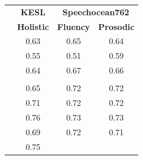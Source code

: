 \documentclass[a4paper]{article}
\begin{document}
\begin{table} [ht]
\centering
    \setcounter{table}{0}
	\begin{tabular}{c|c|c|c}
	\Xhline{4\arrayrulewidth}

	\multicolumn{1}{l}{{\textbf{Method}}}&
	\multicolumn{1}{|c}{\textbf{KESL}}&
	\multicolumn{2}{|c}{\textbf{Speechocean762}} \\ \cline{2-4}
    
    
	\multicolumn{1}{p{2.5cm}}{}&
	\multicolumn{1}{|p{1.0cm}}{\centering\textbf{Holistic}}& 
	\multicolumn{1}{|p{1.0cm}}{\centering\textbf{Fluency}}&
	\multicolumn{1}{|p{1.0cm}}{\centering\textbf{Prosodic}}\\

    \Xhline{3\arrayrulewidth}
	\multicolumn{1}{l}{\text{GOP}}&
	\multicolumn{1}{|c}{0.63}&
	\multicolumn{1}{|c}{0.65}&
	\multicolumn{1}{|c}{0.64}\\

	\multicolumn{1}{l}{\text{Agg + Seq}}&
	\multicolumn{1}{|c}{0.55}&
	\multicolumn{1}{|c}{0.51}&
	\multicolumn{1}{|c}{0.59}\\
	
	\multicolumn{1}{l}{\text{Agg + Seq + GOP}} &
	\multicolumn{1}{|c}{0.64}&
	\multicolumn{1}{|c}{0.67}&
	\multicolumn{1}{|c}{0.66}\\
	
    \Xhline{3\arrayrulewidth}
	\multicolumn{1}{l}{pre-trained} &
	\multicolumn{1}{|c}{}&
	\multicolumn{1}{|c}{}&
	\multicolumn{1}{|c}{}\\ 
    
	\multicolumn{1}{l}{\quad \text{wav2vec2 Base}} &
	\multicolumn{1}{|c}{0.65}&
	\multicolumn{1}{|c}{0.72}&
	\multicolumn{1}{|c}{0.72}\\

	\multicolumn{1}{l}{\quad \text{wav2vec2 Large}} &
	\multicolumn{1}{|c}{0.71}&
	\multicolumn{1}{|c}{0.72}&
	\multicolumn{1}{|c}{0.72}\\

	\multicolumn{1}{l}{\quad \text{wav2vec2 Robust}} &
	\multicolumn{1}{|c}{0.76}&
	\multicolumn{1}{|c}{0.73}&
	\multicolumn{1}{|c}{0.73}\\

	\multicolumn{1}{l}{\quad \text{HuBERT Base}} &
	\multicolumn{1}{|c}{0.69}&
	\multicolumn{1}{|c}{0.72}&
	\multicolumn{1}{|c}{0.71}\\

	\multicolumn{1}{l}{\quad \text{HuBERT Large}} &
	\multicolumn{1}{|c}{0.75}&
	

\end{tabular}
\end{table}
\end{document}
